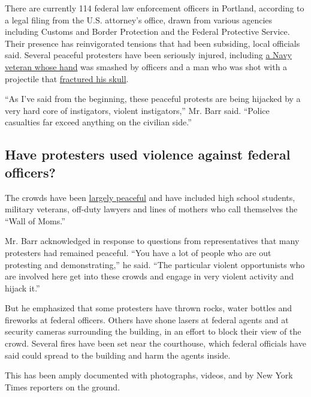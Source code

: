 There are currently 114 federal law enforcement officers in Portland,
according to a legal filing from the U.S. attorney's office, drawn from
various agencies including Customs and Border Protection and the Federal
Protective Service. Their presence has reinvigorated tensions that had
been subsiding, local officials said. Several peaceful protesters have
been seriously injured, including
\href{https://www.nytimes3xbfgragh.onion/2020/07/20/us/portland-protests-navy-christopher-david.html}{a
Navy veteran whose hand} was smashed by officers and a man who was shot
with a projectile that
\href{https://www.oregonlive.com/news/2020/07/police-shoot-portland-protester-in-head-with-impact-weapon-causing-severe-injuries.html}{fractured
his skull}.

``As I've said from the beginning, these peaceful protests are being
hijacked by a very hard core of instigators, violent instigators,'' Mr.
Barr said. ``Police casualties far exceed anything on the civilian
side.''

\hypertarget{have-protesters-used-violence-against-federal-officers}{%
\subsection{Have protesters used violence against federal
officers?}\label{have-protesters-used-violence-against-federal-officers}}

The crowds have been
\href{https://www.nytimes3xbfgragh.onion/2020/07/27/us/protests-divisions-blm.html}{largely
peaceful} and have included high school students, military veterans,
off-duty lawyers and lines of mothers who call themselves the ``Wall of
Moms.''

Mr. Barr acknowledged in response to questions from representatives that
many protesters had remained peaceful. ``You have a lot of people who
are out protesting and demonstrating,'' he said. ``The particular
violent opportunists who are involved here get into these crowds and
engage in very violent activity and hijack it.''

But he emphasized that some protesters have thrown rocks, water bottles
and fireworks at federal officers. Others have shone lasers at federal
agents and at security cameras surrounding the building, in an effort to
block their view of the crowd. Several fires have been set near the
courthouse, which federal officials have said could spread to the
building and harm the agents inside.

This has been amply documented with photographs, videos, and by New York
Times reporters on the ground.

